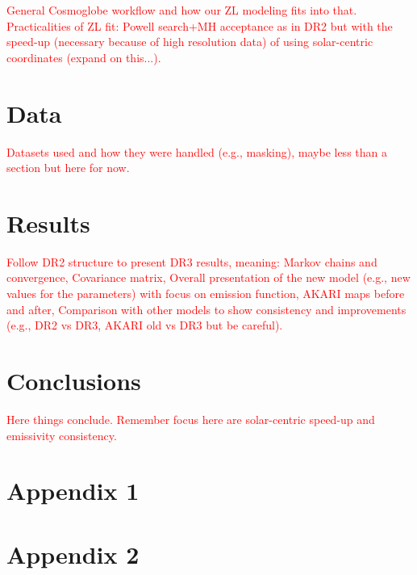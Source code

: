 \documentclass{aa}
\newcommand{\angela}[0]{\textcolor{red}}
\begin{document}
\angela{General Cosmoglobe workflow and how our ZL modeling fits into that.
Practicalities of ZL fit: Powell search+MH acceptance as in DR2 but with the speed-up (necessary 
because of high resolution data) of using solar-centric coordinates (expand on this...).}

\section{Data}

\angela{Datasets used and how they were handled (e.g., masking), maybe less than a section but here for now.}

\section{Results}

\angela{Follow DR2 structure to present DR3 results, meaning:
Markov chains and convergence,
Covariance matrix,
Overall presentation of the new model (e.g., new values for the parameters) with focus on emission function,
AKARI maps before and after,
Comparison with other models to show consistency and improvements (e.g., DR2 vs DR3, AKARI old vs DR3 but be careful).}

\section{Conclusions}

\angela{Here things conclude. Remember focus here are solar-centric speed-up and emissivity consistency.}






\clearpage
\appendix
\onecolumn
\section{Appendix 1}

\section{Appendix 2}
\end{document}
